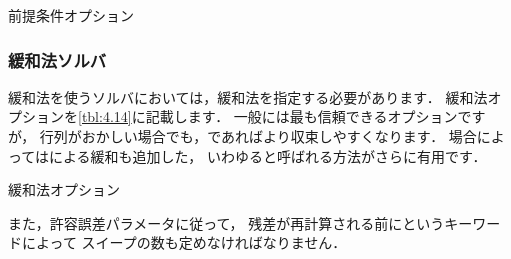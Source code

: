 \begin{table}[ht]
 
 \caption{前提条件オプション}
 \label{tbl:4.13}
\end{table}


\subsubsection{緩和法ソルバ}
\label{sssec:4.5.1.3}
緩和法を使うソルバにおいては，緩和法を指定する必要があります．
緩和法オプションを\autoref{tbl:4.14}に記載します．
一般には最も信頼できるオプションですが，
行列がおかしい場合でも，であればより収束しやすくなります．
場合によってはによる緩和も追加した，
いわゆると呼ばれる方法がさらに有用です．


\begin{table}[ht]
 
 \caption{緩和法オプション}
 \label{tbl:4.14}
\end{table}


また，許容誤差パラメータに従って，
残差が再計算される前にというキーワードによって
スイープの数も定めなければなりません．


